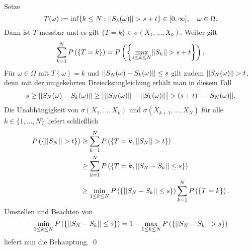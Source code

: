 \begin{proof*}
    Setze 
    $$
        T(\omega) := \inf\{k \leq N: \lvert\lvert S_k(\omega) \rvert\rvert > s + t\} \in [0, \infty], \quad \omega \in \Omega. 
    $$
    Dann ist $T$ messbar und es gilt $\{T = k\} \in \sigma(X_1,...,X_k)$. Weiter gilt 
    $$
        \sum_{k=1}^N P\left(\left\{ T = k \right\}\right) = P\left(\left\{ \max_{1\leq k \leq N}\lvert\lvert S_k \rvert\rvert > s+t \right\}\right).
    $$
    Für $\omega \in \Omega$ mit $T(\omega) = k$ und $\lvert\lvert S_N(\omega) - S_k(\omega) \rvert\rvert \leq s$ gilt zudem $\lvert\lvert S_N(\omega) \rvert\rvert > t$, denn mit der umgekehrten Dreiecksungleichung erhält man in diesem Fall
    $$
        s \geq \lvert\lvert S_N(\omega) - S_k(\omega) \rvert\rvert \geq \big\lvert\lvert\lvert S_N(\omega) \rvert\rvert-\lvert\lvert S_k(\omega) \rvert\rvert\big\rvert > (s+t) - \lvert\lvert S_N(\omega) \rvert\rvert.
    $$
    Die Unabhängigkeit von $\sigma(X_1,...,X_k)$  und $\sigma(X_{k+1},...,X_N)$ für alle $k \in \{1,...,N\}$ liefert schließlich
    \begin{align*}
        P\left(\left\{ \lvert\lvert S_N \rvert\rvert > t \right\}\right) &\geq \sum_{k=1}^N P\left(\left\{ T=k, \lvert\lvert S_N \rvert\rvert > t \right\}\right)  \\\
                              &\geq \sum_{k=1}^N P\left(\left\{ T=k, \lvert\lvert S_N - S_k \rvert\rvert \leq s \right\}\right) \\\
                              &\geq \min_{1\leq k \leq N}P\left(\left\{ \lvert\lvert S_N-S_k \rvert\rvert \leq s \right\}\right) \sum_{k=1}^N P\left(\left\{ T=k \right\}\right). 
    \end{align*}
    Umstellen und Beachten von 
    $$
        \min_{1\leq k \leq N}P\left(\left\{ \lvert\lvert S_N-S_k \rvert\rvert \leq s \right\}\right) = 1 - \max_{1\leq k \leq N}P\left(\left\{ \lvert\lvert S_N - S_k \rvert\rvert > s \right\}\right)
    $$
    liefert nun die Behauptung. \qed
\end{proof*}